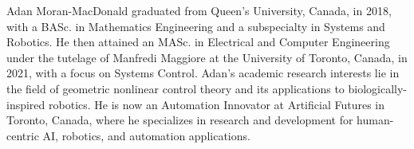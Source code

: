 Adan Moran-MacDonald graduated from Queen's University, Canada, in 2018,
with a BASc. in Mathematics Engineering and a subspecialty in Systems and Robotics.
He then attained an MASc. in Electrical and Computer Engineering under the 
tutelage of Manfredi Maggiore at the University of Toronto, Canada, in 2021, 
with a focus on Systems Control.
Adan's academic research interests lie in the field of geometric nonlinear control
theory and its applications to biologically-inspired robotics.
He is now an Automation Innovator at Artificial Futures in Toronto, Canada,
where he specializes in research and development for human-centric AI, robotics,
and automation applications.